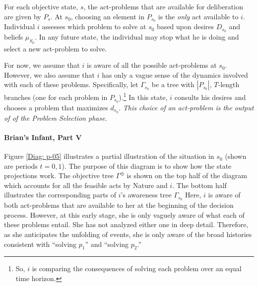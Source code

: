 \documentclass[
11pt,
titlepage,
reqno,
]{article}%
\theoremstyle{definition}
\begin{document}
For each objective state, $s$, the act-problems that are available for deliberation are given by $P_s$.
At $s_0$, choosing an element in $P_{s_0}$ is the \textit{only} act available to $i$.
Individual $i$ assesses which problem to solve at $s_0$ based upon desires $D_{s_0}$ and beliefs $\mu_{S_0}$.
In any future state, the individual may stop what he is doing and select a new act-problem to solve.

For now, we assume that $i$ is aware of all the possible act-problems at $s_0$.
However, we also assume that $i$ has only a vague sense of the dynamics involved with each of these problems.
Specifically, let $\Gamma_{s_0}$ be a tree with $|P_{s_0}|$, $T$-length branches (one for each problem in $P_{s_0}$).\footnote
{
	So, $i$ is comparing the consequences of solving each problem over an equal time horizon.
}
In this state, $i$ consults his desires and chooses a problem that maximizes $d_{s_0}$.
\textit{This choice of an act-problem is the output of of the Problem Selection phase}.

\paragraph{Brian's Infant, Part V}
Figure \ref{Diag: p-05} illustrates  a partial illustration of the situation in $s_0$ (shown are periods $t=0,1$).
The purpose of this diagram is to show how the state projections work.
The objective tree $\Gamma^\oplus$ is shown on the top half of the diagram which accounts for all the feasible acts by Nature and $i$.
The bottom half illustrates the corresponding parts of $i$'s awareness tree $\Gamma_{s_0}$
Here, $i$ is aware of both act-problems that are available to her at the beginning of the decision process.
However, at this early stage, she is only vaguely aware of what each of these problems entail.
She has not analyzed either one in deep detail.
Therefore, as she anticipates the unfolding of events, she is only aware of the broad histories consistent with ``solving $p_1$'' and ``solving $p_2$.''
\end{document}
